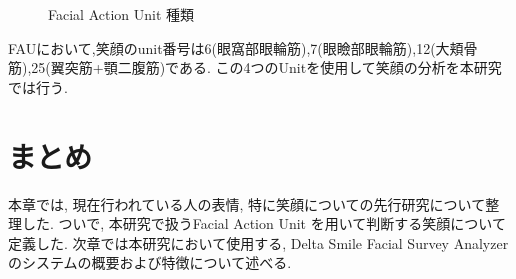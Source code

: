     \begin{figure}[htbp]
        \begin{center}
        \end{center}
        \caption{Facial Action Unit 種類}
        \label{fig:faus2}
        \end{figure}
  FAUにおいて,笑顔のunit番号は6(眼窩部眼輪筋),7(眼瞼部眼輪筋),12(大頬骨筋),25(翼突筋+顎二腹筋)である.
  この4つのUnitを使用して笑顔の分析を本研究では行う.
\section{まとめ}
本章では, 現在行われている人の表情, 特に笑顔についての先行研究について整理した.
ついで, 本研究で扱うFacial Action Unit を用いて判断する笑顔について定義した.
次章では本研究において使用する, Delta Smile Facial Survey Analyzer のシステムの概要および特徴について述べる.
